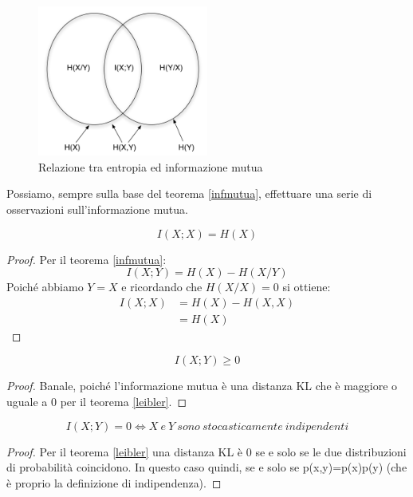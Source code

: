 \begin{figure}[htbp]
\begin{center}
	\includegraphics[width=0.5\textwidth]{img/mutua.pdf}
\caption{Relazione tra entropia ed informazione mutua}
\label{fig:mutua}
\end{center}
\end{figure}

\noindent
Possiamo, sempre sulla base del teorema \ref{infmutua}, effettuare una serie di osservazioni sull'informazione mutua.

\begin{osservazione}
\[
 I(X;X)=H(X)
\]
\begin{proof}
  Per il teorema \ref{infmutua}:
  \[
  I(X;Y)=H(X)-H(X/Y)
  \]
  Poiché abbiamo $Y = X$ e ricordando che $H(X/X) = 0$ si ottiene:
  \[\begin{split}
  I(X;X)&=H(X) - H(X,X) \\
        &=H(X)
    \end{split}
  \]
 \end{proof}
\end{osservazione}

\begin{osservazione}
 \[
   I(X;Y) \ge 0  
 \]
 \begin{proof}
  Banale, poiché l'informazione mutua è una distanza KL che è maggiore o uguale a 0 per il teorema \ref{leibler}.
 \end{proof}
\label{distinf}
\end{osservazione}

\begin{osservazione}
 \[
   I(X;Y)=0 \iff X \ e \ Y \ sono \ stocasticamente \ indipendenti  
 \]
 \begin{proof}
  Per il teorema \ref{leibler} una distanza KL è 0 se e solo se le due distribuzioni di probabilità coincidono.
  In questo caso quindi, se e solo se p(x,y)=p(x)p(y) (che è proprio la definizione di indipendenza).
 \end{proof}
 \label{mutuaindip}
\end{osservazione}

